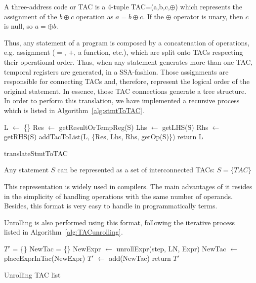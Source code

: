 \theoremstyle{definition}
\begin{definition}\label{def:TAC}
	A three-address code or TAC is a 4-tuple TAC=(a,b,c,$\oplus$) which 
	represents the 	assignment of the $b \oplus c$ operation as $a=b \oplus c$. 
	If the $\oplus$ operator is unary, then $c$ is null, so $a=\oplus b$.
\end{definition}

Thus, any statement of a program is composed by a concatenation of operations, 
e.g. assignment ($=$, $+$, a function, etc.), 
which are 
split onto TACs respecting  their operational order. Thus, when any statement 
generates more than one TAC, temporal registers are generated, in a 
SSA-fashion. Those assignments are 
responsible for connecting TACs and, therefore, represent the logical order of 
the original statement. In essence, those TAC connections generate a tree 
structure. In order to 
perform this translation, we have 
implemented a recursive process which is listed in 
Algorithm~\ref{alg:stmtToTAC}. 

\begin{algorithm}[h]\label{alg:stmtToTAC}
	\SetAlgoLined
	L $\leftarrow$ \{\}\;
	Res $\leftarrow$ getResultOrTempReg(S)\;
	Lhs $\leftarrow$ getLHS(S)\;
	Rhs $\leftarrow$ getRHS(S)\;
	addTacToList(L, \{Res, Lhs, Rhs, getOp(S)\})\;
	return L\;
	\caption{translateStmtToTAC}
\end{algorithm}

\begin{corollary}\label{cor:TAC}
	Any statement $S$ can be represented as a set of interconnected TACs:
	$S = \{TAC\}$
\end{corollary}

This representation is widely used in compilers. The main advantages of it
resides in the simplicity of handling operations with the same number of
operands. Besides, this format is very easy to handle in programmatically terms.


Unrolling is also performed using this format, following the iterative process
listed in
Algorithm~\ref{alg:TACunrolling}.

\begin{algorithm}[H]\label{alg:TACunrolling}
	\SetAlgoLined
	$T'$ = \{\}\;
	 {
		 {
			 {
				NewTac = \{\}\;
				 {
					NewExpr $\leftarrow$ unrollExpr(step, LN, Expr)\;
					NewTac $\leftarrow$ placeExprInTac(NewExpr)\;
				}
				$T'$ $\leftarrow$ add(NewTac)\;
			}
		}
	}
	return $T'$\;
	\caption{Unrolling TAC list}
\end{algorithm}


